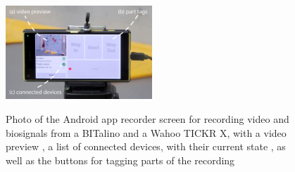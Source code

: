\begin{figure}[ht]
   \centering
   {
   	\includegraphics[width=0.49\textwidth]{include/images/android-app-photo.jpg}
   	\label{fig:android-app-preview}
   	\label{fig:android-app-parts}
   	\label{fig:android-app-devices}
   }
   \captionsetup{subrefformat=parens}
   \caption[Android recorder]{Photo of the Android app recorder screen for recording video and biosignals from a BITalino and a Wahoo TICKR X, with a video preview , a list of connected devices, with their current state , as well as the buttons for tagging parts of the recording }
   \label{fig:android-app}
\end{figure}